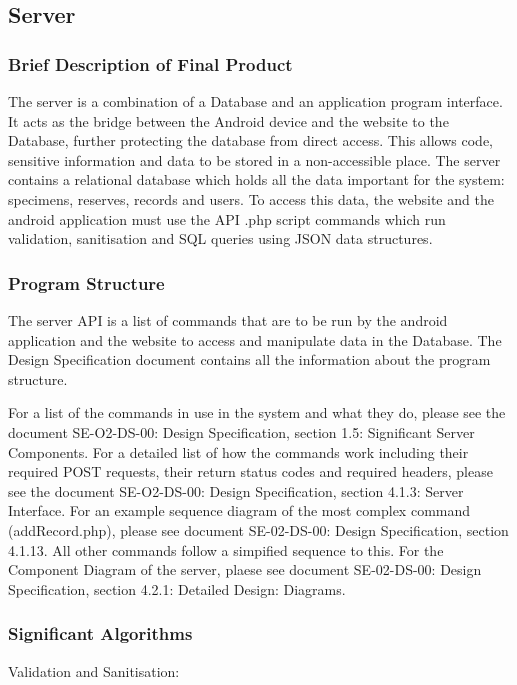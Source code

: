 \subsection{Server}
    \subsubsection{Brief Description of Final Product}
        The server is a combination of a Database and an application program interface. It acts as the bridge between the Android device and the website to the Database, further protecting the database from direct access. This allows code, sensitive information and data to be stored in a non-accessible place. The server contains a relational database which holds all the data important for the system: specimens, reserves, records and users. To access this data, the website and the android application must use the API .php script commands which run validation, sanitisation and SQL queries using JSON data structures. 

    \subsubsection{Program Structure}
        The server API is a list of commands that are to be run by the android application and the website to access and manipulate data in the Database. The Design Specification document contains all the information about the program structure.

        For a list of the commands in use in the system and what they do, please see the document SE-O2-DS-00: Design Specification, section 1.5: Significant Server Components. For a detailed list of how the commands work including their required POST requests, their return status codes and required headers, please see the document SE-O2-DS-00: Design Specification, section 4.1.3: Server Interface. For an example sequence diagram of the most complex command (addRecord.php), please see document SE-02-DS-00: Design Specification, section 4.1.13. All other commands follow a simpified sequence to this. For the Component Diagram of the server, plaese see document SE-02-DS-00: Design Specification, section 4.2.1: Detailed Design: Diagrams. 

    \subsubsection{Significant Algorithms}

        Validation and Sanitisation:

